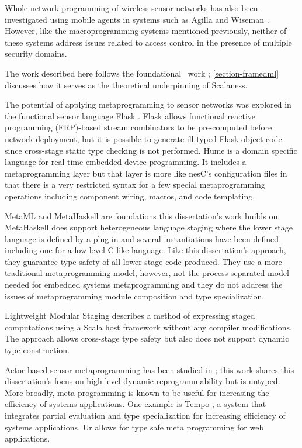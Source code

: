 Whole network programming of wireless sensor networks has also been investigated using mobile
agents in systems such as Agilla \cite{Fok:2009:AMA:1552297.1552299} and Wiseman
\cite{Gonzalez-Valenzuela:2010:PMW:1891545.1891566}. However, like the macro\-programming
systems mentioned previously, neither of these systems address issues related to access control
in the presence of multiple security domains.


The work described here follows the foundational \fml\ work \cite{FramedML};
\autoref{section-framedml} discusses how it serves as the theoretical underpinning of Scalaness.

The potential of applying metaprogramming to sensor networks was explored in the functional
sensor language Flask \cite{Mainland-Flask-2008}. Flask allows functional reactive programming
(FRP)-based stream combinators to be pre-computed before network deployment, but it is possible
to generate ill-typed Flask object code since cross-stage static type checking is not performed.
Hume \cite{Hume} is a domain specific language for real-time embedded device programming. It
includes a metaprogramming layer but that layer is more like nesC's configuration files in that
there is a very restricted syntax for a few special metaprogramming operations including
component wiring, macros, and code templating.

MetaML \cite{Taha-MetaML,DBLP:conf/icess/Taha04} and MetaHaskell \cite{mainland12} are
foundations this dissertation's work builds on. MetaHaskell does support heterogeneous language
staging where the lower stage language is defined by a plug-in and several instantiations have
been defined including one for a low-level C-like language. Like this dissertation's approach,
they guarantee type safety of all lower-stage code produced. They use a more traditional
metaprogramming model, however, not the process-separated model needed for embedded systems
metaprogramming and they do not address the issues of metaprogramming module composition and
type specialization.

Lightweight Modular Staging \cite{Rompf-LMS} describes a method of expressing staged
computations using a Scala host framework without any compiler modifications. The approach
allows cross-stage type safety but also does not support dynamic type construction.

Actor based sensor metaprogramming has been studied in \cite{cheong07}; this work shares this
dissertation's focus on high level dynamic reprogrammability but is untyped. More broadly, meta
programming is known to be useful for increasing the efficiency of systems applications. One
example is Tempo \cite{289140}, a system that integrates partial evaluation and type
specialization for increasing efficiency of systems applications. Ur \cite{UrPLDI10} allows for
type safe meta programming for web applications.

